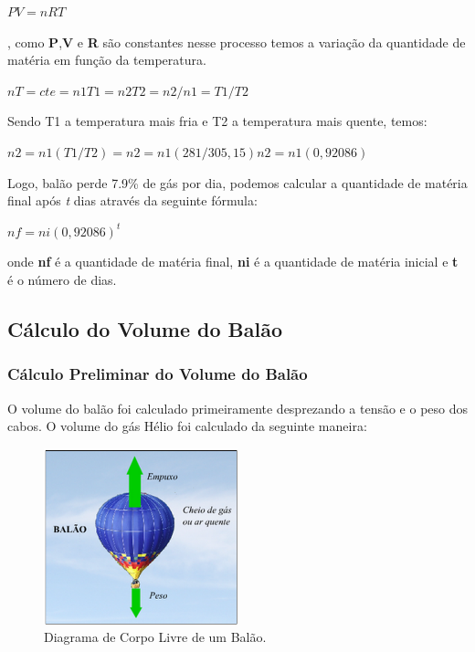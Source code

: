 			$PV = nRT$

		, como \textbf{P},\textbf{V} e \textbf{R} são constantes nesse processo temos a variação da quantidade de matéria em função da temperatura.

		$nT = cte  = n1T1 = n2T2  = n2/n1 = T1/T2$

		Sendo T1 a temperatura mais fria e T2 a temperatura mais quente, temos:

			$n2 = n1(T1/T2) = n2 = n1 (281/305,15) n2 = n1 (0,92086)$

		Logo, balão perde 7.9\% de gás por dia, podemos calcular a quantidade de matéria final após \textit{t} dias através da seguinte fórmula:

			$nf = ni (0,92086)^t$

 		onde \textbf{nf} é a quantidade de matéria final, \textbf{ni} é a quantidade de matéria inicial e \textbf{t} é o número de dias.


\subsection{Cálculo  do Volume do Balão} %
\label{sub:c_lculo_do_volume_do_bal_o}

	\subsubsection{Cálculo Preliminar do Volume do Balão}

	O volume do balão foi calculado primeiramente desprezando a tensão e o peso dos cabos. 	O volume do gás Hélio foi calculado da seguinte maneira:

	\begin{figure}[H]
		\centering
		\includegraphics[width=0.5\textwidth]{figuras/corpoLivreBalao}
		\caption{Diagrama de Corpo Livre de um Balão.}
		\label{img:corpoLivreBalao}
	\end{figure}

